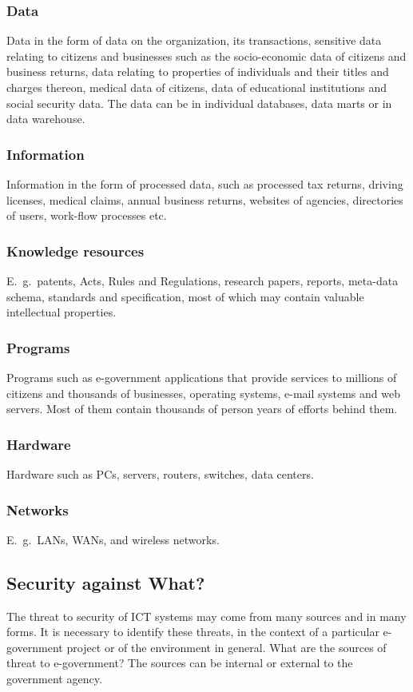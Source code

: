  \subsubsection*{Data}
 Data in the form of data on the organization, its transactions, sensitive data relating to citizens and businesses such as the socio-economic data of citizens and business returns, data relating to properties of individuals and their titles and charges thereon, medical data of citizens, data of educational institutions and social security data. The data can be in individual databases, data marts or in data warehouse.
 
 
 \subsubsection*{Information}
 Information in the form of processed data, such as processed tax returns, driving licenses, medical claims, annual business returns, websites of agencies, directories of users, work-flow processes etc.
 
 \subsubsection*{Knowledge resources}
 E.\ g.\ patents, Acts, Rules and Regulations, research papers, reports, meta-data schema, standards and specification, most of which may contain valuable intellectual properties.
 
 
 \subsubsection*{Programs}
 Programs such as e-government applications that provide services to millions of citizens and thousands of businesses, operating systems, e-mail systems and web servers. Most of them contain thousands of person years of efforts behind them.
 
 \subsubsection*{Hardware}
 Hardware such as PCs, servers, routers, switches, data centers.
 
 \subsubsection*{Networks}
 E.\ g.\ LANs, WANs, and wireless networks.
 
 \subsection{Security against What?}
 The threat to security of ICT systems may come from many sources and in many forms. It is necessary to identify these threats, in the context of a particular e-government project or of the environment in general. What are the sources of threat to e-government?  The sources can be internal or external to the government agency.
 
